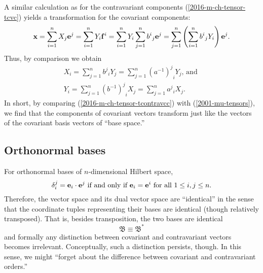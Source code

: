 A similar calculation as for the contravariant components (\ref{2016-m-ch-tensor-tcvc}) yields a transformation for the covariant components:
\begin{equation}
\begin{split}
{\bf x}
=\sum_{i=1}^n X_j {\bf e}^j
=\sum_{i=1}^n { Y }_i {\bf f}^i
=\sum_{i=1}^n { Y }_i \sum_{j=1}^n {b^i}_j {\bf e}^j
=
\sum_{j=1}^n \left( \sum_{i=1}^n {b^i}_j  { Y }_i \right) {\bf e}^j
.
\end{split}
\label{2016-m-ch-tensor-tcontravc}
\end{equation}
Thus, by comparison we obtain
\begin{equation}
\begin{split}
 X_i = \sum_{j=1}^n {b^j}_i  { Y }_j =  \sum_{j=1}^n  {\left( a^{-1} \right)^j}_i  { Y }_j    \textrm{, and }
\\
 Y_i = \sum_{j=1}^n {\left( b^{-1}\right)^j}_i  { X }_j
    = \sum_{j=1}^n {a^j}_i   { X }_j.
\end{split}
\label{2016-m-ch-tensor-tcontravcc}
\end{equation}
In short, by comparing (\ref{2016-m-ch-tensor-tcontravcc})  with (\ref{2001-mu-tensors}), we find that the components of covariant vectors transform just like the vectors of the covariant basis vectors of ``base space.''



\subsection{Orthonormal bases}
For orthonormal bases of $n$-dimensional Hilbert space,
\begin{equation}
\delta_i^j = {\bf e}_i\cdot {\bf e}^j
\textrm { if and only if }
{\bf e}_i= {\bf e}^i  \textrm { for all } 1\le i,j \le n.
\end{equation}
Therefore, the vector space and its dual vector space are ``identical''
in the sense that the coordinate tuples representing their bases are identical
(though relatively transposed).
That is, besides transposition, the two bases are identical
\begin{equation}
{\mathfrak B}\equiv {\mathfrak B}^\ast
\end{equation}
and  formally any distinction between covariant and contravariant vectors becomes
irrelevant. Conceptually, such a distinction persists, though.
In this sense, we might ``forget about the difference between
covariant and contravariant orders.''







